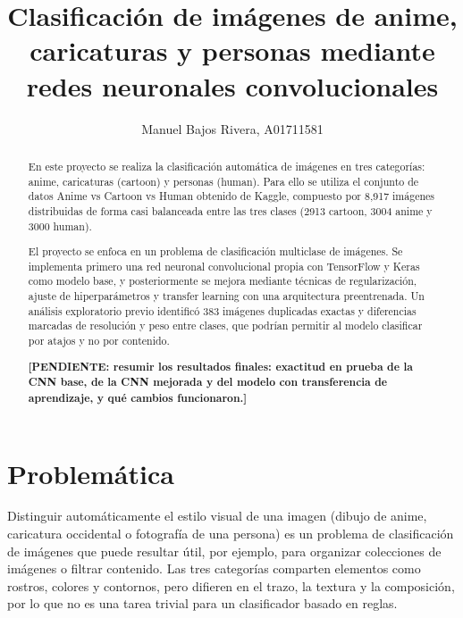 \documentclass[letterpaper, 10 pt, conference]{ieeeconf}
\title{\LARGE \bf
Clasificación de imágenes de anime, caricaturas y personas mediante redes neuronales convolucionales
}
\author{
Manuel Bajos Rivera, A01711581
}
\newcommand{\pendiente}[1]{\textbf{[PENDIENTE: #1]}}
\begin{document}
\maketitle
\thispagestyle{empty}
\pagestyle{empty}


\begin{abstract}

En este proyecto se realiza la clasificación automática de imágenes en tres categorías: anime, caricaturas (cartoon) y personas (human). Para ello se utiliza el conjunto de datos Anime vs Cartoon vs Human obtenido de Kaggle, compuesto por 8,917 imágenes distribuidas de forma casi balanceada entre las tres clases (2913 cartoon, 3004 anime y 3000 human).

El proyecto se enfoca en un problema de clasificación multiclase de imágenes. Se implementa primero una red neuronal convolucional propia con TensorFlow y Keras como modelo base, y posteriormente se mejora mediante técnicas de regularización, ajuste de hiperparámetros y transfer learning con una arquitectura preentrenada. Un análisis exploratorio previo identificó 383 imágenes duplicadas exactas y diferencias marcadas de resolución y peso entre clases, que podrían permitir al modelo clasificar por atajos y no por contenido.

\pendiente{resumir los resultados finales: exactitud en prueba de la CNN base, de la CNN mejorada y del modelo con transferencia de aprendizaje, y qué cambios funcionaron.}

\end{abstract}


\section{Problemática}

Distinguir automáticamente el estilo visual de una imagen (dibujo de anime, caricatura occidental o fotografía de una persona) es un problema de clasificación de imágenes que puede resultar útil, por ejemplo, para organizar colecciones de imágenes o filtrar contenido. Las tres categorías comparten elementos como rostros, colores y contornos, pero difieren en el trazo, la textura y la composición, por lo que no es una tarea trivial para un clasificador basado en reglas.
\end{document}

